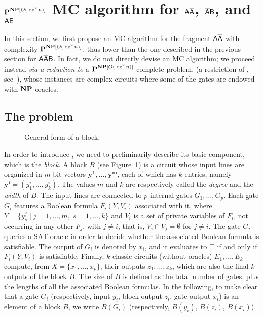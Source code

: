 \section{$\textbf{P}^{\textbf{NP}[O(\log^2 n)]}$ MC algorithm for $\mathsf{A\overline{A}}$, $\mathsf{\overline{A}B}$, and $\mathsf{AE}$}\label{sect:AAbarAlg}

In this section, we first propose an MC algorithm for the fragment $\mathsf{A\overline{A}}$ with complexity $\textbf{P}^{\textbf{NP}[O(\log^2 n)]}$, thus lower than the one described in the previous section for $\mathsf{A\overline{A}B}$.
In fact, we do not directly devise an MC algorithm; we proceed instead \emph{via a reduction to} a
$\textbf{P}^{\textbf{NP}[O(\log^2 n)]}$-complete problem,  \TBSATM{} (a restriction of \TBSAT, see~\cite{schnoebelen2003}), whose instances are complex 
circuits where some of the gates are endowed with $\textbf{NP}$ oracles.
%
%


\subsection{The problem \TBSATM{}}

\begin{figure}[tp]
    \centering
    
    \caption{General form of a block.}\label{blockFig}
\end{figure}

In order to introduce \TBSAT, we need to preliminarily describe its basic component, which is the \emph{block}. A block $B$ (see Figure~\ref{blockFig}) is a circuit
whose input lines are organized in $m$ bit vectors $\boldsymbol{y^1},\ldots,\boldsymbol{y^m}$, each of which has $k$ entries, namely $\boldsymbol{y^i}=(y^i_1, \ldots ,y^i_k)$. The values $m$ and $k$ are respectively called the \emph{degree} and the \emph{width} of $B$.
The input lines are connected to $p$ internal gates $G_1,\ldots,G_p$. Each gate $G_i$
features a Boolean formula $F_i(Y,V_i)$ associated with it, where $Y=\{y^j_s\mid j=1,\dots ,m,\; s=1,\dots , k\}$ and $V_i$ is a set of private variables of $F_i$, not occurring in any other $F_j$, with $j\neq i$, that is, $V_i\cap V_j=\emptyset$ for $j\neq i$.
The gate $G_i$ queries a SAT oracle in order to decide whether the associated Boolean formula is satisfiable.
The output of $G_i$ is denoted by $x_i$, and it evaluates to $\top$ if and only if $F_i(Y,V_i)$ is satisfiable. Finally, $k$ classic circuits (without oracles) $E_1,\ldots,E_k$ compute, from $X=\{x_1, \ldots,x_p\}$, their outputs $z_1,\ldots,z_k$, which are also the final $k$ outputs of the block $B$. 
%
The size of $B$ is defined as the total number of gates, plus the lengths of all the
associated Boolean formulas.
%
In the following, to make clear that a gate $G_i$ (respectively, input $y_i$, block output $z_i$, gate output $x_i$) is an element of a block $B$, we write  $B(G_i)$ (respectively, $B(y_i)$, $B(z_i)$, $B(x_i)$).

